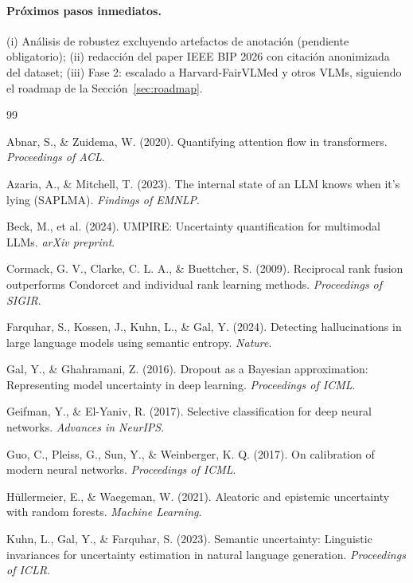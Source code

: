 \documentclass[12pt,a4paper]{article}
\begin{document}
\paragraph{Próximos pasos inmediatos.} (i) Análisis de robustez excluyendo
artefactos de anotación (pendiente obligatorio); (ii) redacción del paper
IEEE BIP 2026 con citación anonimizada del dataset; (iii) Fase 2:
escalado a Harvard-FairVLMed y otros VLMs, siguiendo el roadmap de la
Sección~\ref{sec:roadmap}.

\begin{thebibliography}{99}
\small

Abnar, S., \& Zuidema, W. (2020).
Quantifying attention flow in transformers.
\emph{Proceedings of ACL}.

Azaria, A., \& Mitchell, T. (2023).
The internal state of an LLM knows when it's lying (SAPLMA).
\emph{Findings of EMNLP}.

Beck, M., et al. (2024).
UMPIRE: Uncertainty quantification for multimodal LLMs.
\emph{arXiv preprint}.

Cormack, G. V., Clarke, C. L. A., \& Buettcher, S. (2009).
Reciprocal rank fusion outperforms Condorcet and individual rank learning methods.
\emph{Proceedings of SIGIR}.

Farquhar, S., Kossen, J., Kuhn, L., \& Gal, Y. (2024).
Detecting hallucinations in large language models using semantic entropy.
\emph{Nature}.

Gal, Y., \& Ghahramani, Z. (2016).
Dropout as a Bayesian approximation: Representing model uncertainty in deep learning.
\emph{Proceedings of ICML}.

Geifman, Y., \& El-Yaniv, R. (2017).
Selective classification for deep neural networks.
\emph{Advances in NeurIPS}.

Guo, C., Pleiss, G., Sun, Y., \& Weinberger, K. Q. (2017).
On calibration of modern neural networks.
\emph{Proceedings of ICML}.

Hüllermeier, E., \& Waegeman, W. (2021).
Aleatoric and epistemic uncertainty with random forests.
\emph{Machine Learning}.

Kuhn, L., Gal, Y., \& Farquhar, S. (2023).
Semantic uncertainty: Linguistic invariances for uncertainty estimation in natural language generation.
\emph{Proceedings of ICLR}.


\end{thebibliography}
\end{document}
